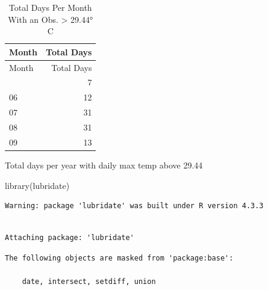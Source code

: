 \documentclass[
  letterpaper,
  DIV=11,
  numbers=noendperiod]{scrreprt}
\newenvironment{Shaded}{\begin{snugshade}}{\end{snugshade}}
\newcommand{\FunctionTok}[1]{\textcolor[rgb]{0.28,0.35,0.67}{#1}}
\newcommand{\NormalTok}[1]{\textcolor[rgb]{0.00,0.23,0.31}{#1}}
\begin{document}
\begin{longtable}[]{@{}lr@{}}
\caption{Total Days Per Month With an Obs. \textgreater{} 29.44°
C}\tabularnewline
\toprule\noalign{}
Month & Total Days \\
\midrule\noalign{}
\endfirsthead
\toprule\noalign{}
Month & Total Days \\
\midrule\noalign{}
\endhead
\bottomrule\noalign{}
\endlastfoot
05 & 7 \\
06 & 12 \\
07 & 31 \\
08 & 31 \\
09 & 13 \\
\end{longtable}

Total days per year with daily max temp above 29.44

\begin{Shaded}
\begin{Highlighting}[]
\FunctionTok{library}\NormalTok{(lubridate)}
\end{Highlighting}
\end{Shaded}

\begin{verbatim}
Warning: package 'lubridate' was built under R version 4.3.3
\end{verbatim}

\begin{verbatim}

Attaching package: 'lubridate'
\end{verbatim}

\begin{verbatim}
The following objects are masked from 'package:base':

    date, intersect, setdiff, union
\end{verbatim}
\end{document}
